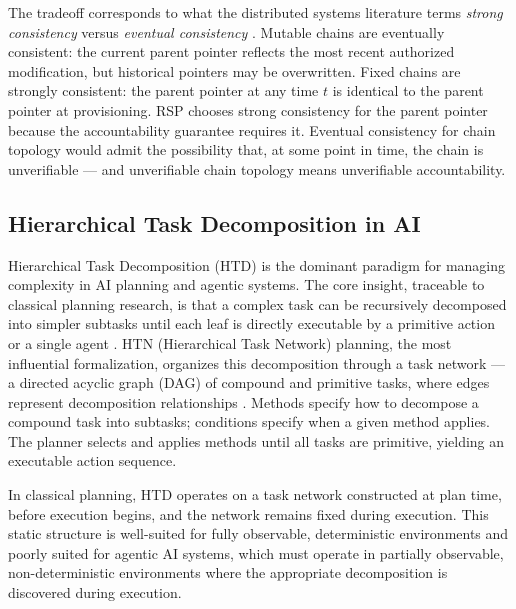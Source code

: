 The tradeoff corresponds to what the distributed systems literature terms \emph{strong consistency} versus \emph{eventual consistency} \cite{vogels2009eventual}. Mutable chains are eventually consistent: the current parent pointer reflects the most recent authorized modification, but historical pointers may be overwritten. Fixed chains are strongly consistent: the parent pointer at any time $t$ is identical to the parent pointer at provisioning. RSP chooses strong consistency for the parent pointer because the accountability guarantee requires it. Eventual consistency for chain topology would admit the possibility that, at some point in time, the chain is unverifiable --- and unverifiable chain topology means unverifiable accountability.

\subsection{Hierarchical Task Decomposition in AI}

Hierarchical Task Decomposition (HTD) is the dominant paradigm for managing complexity in AI planning and agentic systems. The core insight, traceable to classical planning research, is that a complex task can be recursively decomposed into simpler subtasks until each leaf is directly executable by a primitive action or a single agent \cite{nilsson1982principles, ghallab2004htn}. HTN (Hierarchical Task Network) planning, the most influential formalization, organizes this decomposition through a task network --- a directed acyclic graph (DAG) of compound and primitive tasks, where edges represent decomposition relationships \cite{ghallab2004htn}. Methods specify how to decompose a compound task into subtasks; conditions specify when a given method applies. The planner selects and applies methods until all tasks are primitive, yielding an executable action sequence.

In classical planning, HTD operates on a task network constructed at plan time, before execution begins, and the network remains fixed during execution. This static structure is well-suited for fully observable, deterministic environments and poorly suited for agentic AI systems, which must operate in partially observable, non-deterministic environments where the appropriate decomposition is discovered during execution.

